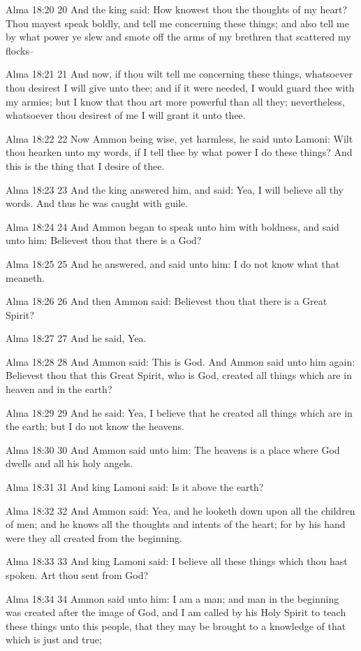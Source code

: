 Alma 18:20
 20 And the king said: How knowest thou the thoughts of my heart?
Thou mayest speak boldly, and tell me concerning these things;
and also tell me by what power ye slew and smote off the arms of
my brethren that scattered my flocks--

Alma 18:21
 21 And now, if thou wilt tell me concerning these things,
whatsoever thou desirest I will give unto thee; and if it were
needed, I would guard thee with my armies; but I know that thou
art more powerful than all they; nevertheless, whatsoever thou
desirest of me I will grant it unto thee.

Alma 18:22
 22 Now Ammon being wise, yet harmless, he said unto Lamoni: Wilt
thou hearken unto my words, if I tell thee by what power I do
these things? And this is the thing that I desire of thee.

Alma 18:23
 23 And the king answered him, and said: Yea, I will believe all
thy words. And thus he was caught with guile.

Alma 18:24
 24 And Ammon began to speak unto him with boldness, and said
unto him: Believest thou that there is a God?

Alma 18:25
 25 And he answered, and said unto him: I do not know what that
meaneth.

Alma 18:26
 26 And then Ammon said: Believest thou that there is a Great
Spirit?

Alma 18:27
 27 And he said, Yea.

Alma 18:28
 28 And Ammon said: This is God. And Ammon said unto him again:
Believest thou that this Great Spirit, who is God, created all
things which are in heaven and in the earth?

Alma 18:29
 29 And he said: Yea, I believe that he created all things which
are in the earth; but I do not know the heavens.

Alma 18:30
 30 And Ammon said unto him: The heavens is a place where God
dwells and all his holy angels.

Alma 18:31
 31 And king Lamoni said: Is it above the earth?

Alma 18:32
 32 And Ammon said: Yea, and he looketh down upon all the
children of men; and he knows all the thoughts and intents of the
heart; for by his hand were they all created from the beginning.

Alma 18:33
 33 And king Lamoni said: I believe all these things which thou
hast spoken. Art thou sent from God?

Alma 18:34
 34 Ammon said unto him: I am a man; and man in the beginning was
created after the image of God, and I am called by his Holy
Spirit to teach these things unto this people, that they may be
brought to a knowledge of that which is just and true;

